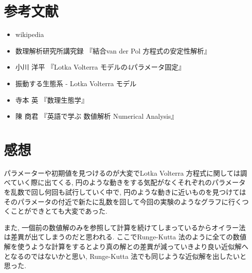 \documentclass[12pt,a4paper]{jsarticle}
\begin{document}
\section{参考文献}
\begin{itemize}
\item wikipedia
\item 数理解析研究所講究録 『結合van der Pol 方程式の安定性解析』
\item 小川 洋平 『Lotka Volterra モデルの4パラメータ固定』
\item 振動する生態系 - Lotka Volterra モデル
\item 寺本 英 『数理生態学』
\item 陳 商君 『英語で学ぶ 数値解析 Numerical Analysis』
\end{itemize}

\section{感想}
パラメーターや初期値を見つけるのが大変でLotka Volterra 方程式に関しては調べていく際に出てくる, 円のような動きをする気配がなくそれぞれのパラメータを乱数で回し何回も試行していく中で, 円のような動きに近いものを見つけてはそのパラメータの付近で新たに乱数を回して今回の実験のようなグラフに行くつくことができとても大変であった.

また, 一個前の数値解のみを参照して計算を続けてしまっているからオイラー法は差異が出てしまうのだと思われる. ここでRunge-Kutta 法のように全ての数値解を使うような計算をするとより真の解との差異が減っていきより良い近似解へとなるのではないかと思い, Runge-Kutta 法でも同じような近似解を出したいと思った.
\end{document}
